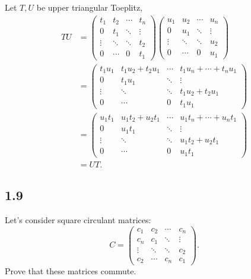 \begin{solution}
  Let $T,U$ be upper triangular Toeplitz,
  \begin{align*}
    TU
    & =
    \begin{pmatrix}
      t_1 & t_2 & \cdots & t_n\\
      0   & t_1 & \ddots & \vdots\\
      \vdots & \ddots & \ddots & t_2\\
      0 & \cdots & 0 & t_1
    \end{pmatrix}
    \begin{pmatrix}
      u_1 & u_2 & \cdots & u_n\\
      0   & u_1 & \ddots & \vdots\\
      \vdots & \ddots & \ddots & u_2\\
      0 & \cdots & 0 & u_1
    \end{pmatrix}\\
    & =
    \begin{pmatrix}
      t_1u_1 & t_1u_2 + t_2u_1 & \cdots & t_1u_n + \cdots + t_nu_1\\
      0   & t_1u_1 & \ddots & \vdots\\
      \vdots & \ddots & \ddots & t_1u_2 + t_2u_1\\
      0 & \cdots & 0 & t_1u_1
    \end{pmatrix}\\
    & =
    \begin{pmatrix}
      u_1t_1 & u_1t_2 + u_2t_1 & \cdots & u_1t_n + \cdots + u_nt_1\\
      0   & u_1t_1 & \ddots & \vdots\\
      \vdots & \ddots & \ddots & u_1t_2 + u_2t_1\\
      0 & \cdots & 0 & u_1t_1
    \end{pmatrix}\\
    & = UT.
  \end{align*}
\end{solution}

\subsection*{1.9}
Let's consider square circulant matrices:
\[
  C =
  \begin{pmatrix}
    c_1 & c_2 & \cdots & c_n\\
    c_n & c_1 & \ddots & \vdots\\
    \vdots & \ddots & \ddots & c_2\\
    c_2 & \cdots & c_n & c_1
  \end{pmatrix}.
\]
Prove that these matrices commute.

